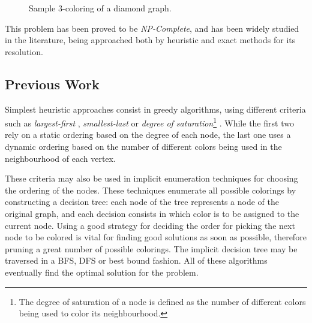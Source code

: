 \begin{figure}[h]
	\centering
\caption{Sample 3-coloring of a diamond graph.}
	\label{fig:samplecoloring}
\end{figure}

This problem has been proved to be \textit{NP-Complete}, and has been widely studied in the literature, being approached both by heuristic and exact methods for its resolution.

\subsection*{Previous Work}

Simplest heuristic approaches consist in greedy algorithms, using different criteria such as \textit{largest-first} \cite{welsh1967upper}, \textit{smallest-last} \cite{matula1972graph} or \textit{degree of saturation}\footnote{The degree of saturation of a node is defined as the number of different colors being used to color its neighbourhood.} \cite{brelaz1979new}. While the first two rely on a static ordering based on the degree of each node, the last one uses a dynamic ordering based on the number of different colors being used in the neighbourhood of each vertex.

These criteria may also be used in implicit enumeration techniques for choosing the ordering of the nodes. These techniques enumerate all possible colorings by constructing a decision tree: each node of the tree represents a node of the original graph, and each decision consists in which color is to be assigned to the current node. Using a good strategy for deciding the order for picking the next node to be colored is vital for finding good solutions as soon as possible, therefore pruning a great number of possible colorings. The implicit decision tree may be traversed in a BFS, DFS or best bound fashion. All of these algorithms eventually find the optimal solution for the problem.

